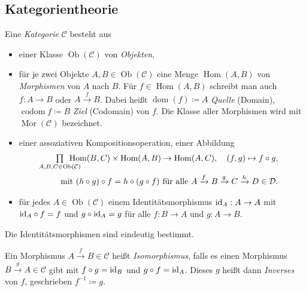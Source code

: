 \documentclass{cheat-sheet}
\DeclareMathOperator{\Ob}{Ob} %
\DeclareMathOperator{\Hom}{Hom} %
\DeclareMathOperator{\Mor}{Mor} %
\DeclareMathOperator{\dom}{dom} %
\DeclareMathOperator{\codom}{codom} %
\begin{document}
\begin{samepage}
\section{Kategorientheorie}

\begin{defn}
  Eine \emph{Kategorie} $\mathcal{C}$ besteht aus
  \begin{itemize}
    \item einer Klasse $\Ob(\mathcal{C})$ von \emph{Objekten},
    \item für je zwei Objekte $A, B \in \Ob(\mathcal{C})$ eine Menge $\Hom(A, B)$ von \emph{Morphismen} von $A$ nach $B$. Für $f \in \Hom(A, B)$ schreibt man auch $f : A \to B$ oder $A \xrightarrow{f} B$. Dabei heißt $\dom(f) \coloneqq A$ \emph{Quelle} (Domain), $\codom{f} \coloneqq B$ \emph{Ziel} (Codomain) von $f$. Die Klasse aller Morphismen wird mit $\Mor(\mathcal{C})$ bezeichnet.
    \item einer assoziativen Kompositionsoperation, \dh{} einer Abbildung
    \begin{align*}
      \quad \prod_{\mathclap{A, B, C \in \Ob(\mathcal{C})}} \enspace \Hom(B, C) \times \Hom(A, B) \to \Hom(A, C), \quad
      (f, g) \mapsto f \circ g,\\
      \text{mit } (h \circ g) \circ f = h \circ (g \circ f)
      \text{ für alle } A \xrightarrow{f} B \xrightarrow{g} C \xrightarrow{h} D \in \mathcal{D}.
    \end{align*}
    \item für jedes $A \in \Ob(\mathcal{C})$ einem Identitätsmorphismus $\mathrm{id}_A : A \to A$ mit $\mathrm{id}_A \circ f = f$ und $g \circ \mathrm{id}_A = g$ für alle $f : B \to A$ und $g : A \to B$.
  \end{itemize}
\end{defn}
\end{samepage}

\begin{bem}
  Die Identitätsmorphismen sind eindeutig bestimmt.
\end{bem}

\begin{defn}
  Ein Morphismus $A \xrightarrow{f} B \in \mathcal{C}$ heißt \emph{Isomorphismus}, falls es einen Morphismus $B \xrightarrow{g} A \in \mathcal{C}$ gibt mit $f \circ g = \mathrm{id}_B$ und $g \circ f = \mathrm{id}_A$. Dieses $g$ heißt dann \emph{Inverses} von $f$, geschrieben $f^{-1} \coloneqq g$.
\end{defn}
\end{document}
